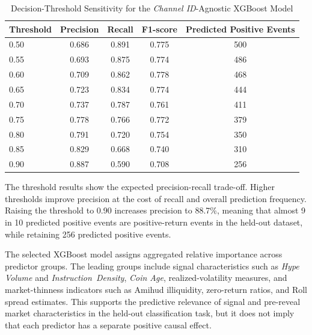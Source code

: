 \begin{table}[htbp]
\centering
\caption{Decision-Threshold Sensitivity for the \textit{Channel ID}-Agnostic XGBoost Model}
\label{tab:threshold-optimization}
\small
\begin{tabular}{|l|c|c|c|c|}
\toprule
\multicolumn{1}{|c|}{\textbf{Threshold}} & \multicolumn{1}{c|}{\textbf{Precision}} & \multicolumn{1}{c|}{\textbf{Recall}} & \multicolumn{1}{c|}{\textbf{F1-score}} & \multicolumn{1}{c|}{\textbf{Predicted Positive Events}} \\
\midrule
0.50 & 0.686 & 0.891 & 0.775 & 500 \\
0.55 & 0.693 & 0.875 & 0.774 & 486 \\
0.60 & 0.709 & 0.862 & 0.778 & 468 \\
0.65 & 0.723 & 0.834 & 0.774 & 444 \\
0.70 & 0.737 & 0.787 & 0.761 & 411 \\
0.75 & 0.778 & 0.766 & 0.772 & 379 \\
0.80 & 0.791 & 0.720 & 0.754 & 350 \\
0.85 & 0.829 & 0.668 & 0.740 & 310 \\
0.90 & 0.887 & 0.590 & 0.708 & 256 \\
\bottomrule
\end{tabular}
\end{table}

The threshold results show the expected precision-recall trade-off. Higher thresholds improve precision at the cost of recall and overall prediction frequency. Raising the threshold to 0.90 increases precision to 88.7\%, meaning that almost 9 in 10 predicted positive events are positive-return events in the held-out dataset, while retaining 256 predicted positive events.

The selected XGBoost model assigns aggregated relative importance across predictor groups. The leading groups include signal characteristics such as \textit{Hype Volume} and \textit{Instruction~Density}, \textit{Coin Age}, realized-volatility measures, and market-thinness indicators such as Amihud illiquidity, zero-return ratios, and Roll spread estimates. This supports the predictive relevance of signal and pre-reveal market characteristics in the held-out classification task, but it does not imply that each predictor has a separate positive causal effect.
